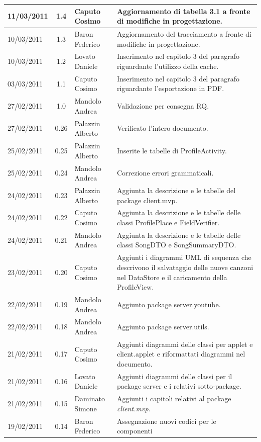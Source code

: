 \begin{longtable}{|p{}|c|p{}|p{}|}
\hline
11/03/2011 & 1.4 & Caputo Cosimo & Aggiornamento di tabella 3.1 a fronte di
modifiche in progettazione.\\
\hline
10/03/2011 & 1.3 & Baron Federico & Aggiornamento del tracciamento a fronte
di modifiche in progettazione.\\
\hline
10/03/2011 & 1.2 & Lovato Daniele & Inserimento nel capitolo 3 del paragrafo
riguardante l'utilizzo della cache.\\
\hline
03/03/2011 & 1.1 & Caputo Cosimo & Inserimento nel capitolo 3 del paragrafo
riguardante l'esportazione in PDF.\\
\hline
27/02/2011 & 1.0 & Mandolo Andrea & Validazione per consegna RQ.\\
\hline
27/02/2011 & 0.26 & Palazzin Alberto & Verificato l'intero documento.\\
\hline
25/02/2011 & 0.25 & Palazzin Alberto & Inserite le tabelle di ProfileActivity.\\
\hline
25/02/2011 & 0.24 & Mandolo Andrea & Correzione errori grammaticali.\\
\hline
24/02/2011 & 0.23 & Palazzin Alberto & Aggiunta la descrizione e le tabelle
del package client.mvp.\\
\hline
24/02/2011 & 0.22 & Caputo Cosimo & Aggiunta la descrizione e le tabelle
delle classi ProfilePlace e FieldVerifier.\\
\hline
24/02/2011 & 0.21 & Mandolo Andrea & Aggiunta la descrizione e le tabelle
delle classi SongDTO e SongSummaryDTO.\\
\hline
23/02/2011 & 0.20 & Caputo Cosimo & Aggiunti i diagrammi UML di sequenza
che descrivono il salvataggio delle nuove canzoni nel DataStore e il caricamento della ProfileView.\\
\hline
22/02/2011 & 0.19 & Mandolo Andrea & Aggiunto package server.youtube.\\
\hline
22/02/2011 & 0.18 & Mandolo Andrea & Aggiunto package server.utils.\\
\hline
21/02/2011 & 0.17 & Caputo Cosimo & Aggiunti diagrammi delle classi per applet
e client.applet e riformattati diagrammi nel documento.\\
\hline
21/02/2011 & 0.16 & Lovato Daniele & Aggiunti diagrammi delle classi per il
package server e i relativi sotto-package.\\
\hline
21/02/2011 & 0.15 & Daminato Simone & Aggiunti i capitoli relativi al package
\emph{client.mvp}.\\
\hline
19/02/2011 & 0.14 & Baron Federico & Assegnazione nuovi codici per le componenti

\end{longtable}
